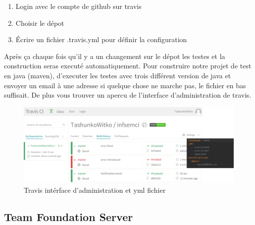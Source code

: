 \begin{enumerate}
	\item Login avec le compte de github sur travis
	\item Choisir le dépot
	\item Écrire un fichier .travis.yml pour définir la configuration
\end{enumerate}

Après ça chaque fois qu'il y a un changement sur le dépot les testes et la construction seras executé automatiquement. Pour construire notre projet de test en java (maven), d'executer les testes avec trois différent version de java et envoyer un email à une adresse si quelque chose ne marche pas, le fichier en bas suffisait. De plus vous trouver un apercu de l'interface d'administration de travis.

\begin{figure}[H]
	\centering
		\includegraphics[scale=0.2]{bilder/travisciymlfile}
	\caption{Travis intérface d'administration et yml fichier}
	\label{fig:travisgui}
\end{figure}
\clearpage
\subsection{Team Foundation Server}



